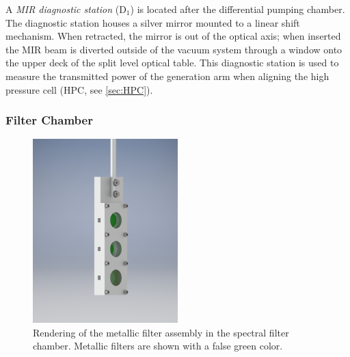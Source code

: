 A \textit{MIR diagnostic station} (D$_1$) is located after the differential pumping chamber. The diagnostic station houses a silver mirror mounted to a linear shift mechanism. When retracted, the mirror is out of the optical axis; when inserted the MIR beam is diverted outside of the vacuum system through a window onto the upper deck of the split level optical table. This diagnostic station is used to measure the transmitted power of the generation arm when aligning the high pressure cell (HPC, see \cref{sec:HPC}).

\subsubsection{Filter Chamber}
\label{sec:filter_chamber}

\begin{figure}
	\centering
	\includegraphics[width=0.50\textwidth]{figures/chap2/filter_stick.png}
	\caption{Rendering of the metallic filter assembly in the spectral filter chamber. Metallic filters are shown with a false green color.}
	\label{fig:filter_stick}
\end{figure}

